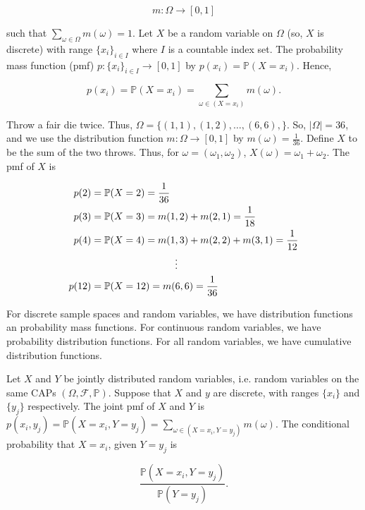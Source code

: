 \documentclass[12pt]{article}
\newcommand{\faps}{(\Omega, \field, \mathbb{P})}
\newcommand{\field}{\mathcal{F}}
\newcommand{\prob}[1]{\mathbb{P}(#1)}
\newcommand{\nspace}{\vspace*{.5cm}}
\newcommand{\nline}{\nspace \noindent}
\begin{document}
\begin{equation*}
m : \Omega \rightarrow [0,1]
\end{equation*}

\noindent
such that $\sum_{\omega \in \Omega} m(\omega) = 1$. Let $X$ be a random variable on $\Omega$ (so, $X$ is discrete) with range $\{ x_i \}_{i \in I}$ where $I$ is a countable index set. The probability mass function (pmf) $p: \{ x_i \}_{i \in I} \rightarrow [0,1]$ by $p(x_i) = \prob{X = x_i}$. Hence, 

\begin{equation*}
p(x_i) = \prob{X = x_i} = \sum_{\omega \in (X = x_i)} m(\omega).
\end{equation*}

\noindent
Throw a fair die twice. Thus, $\Omega = \Big \{ (1,1), (1,2), \ldots, (6,6), \Big \}$. So, $\lvert \Omega \rvert = 36$, and we use the distribution function $m : \Omega \rightarrow [0,1]$ by $m(\omega) = \frac{1}{36}$. Define $X$ to be the sum of the two throws. Thus, for $\omega = (\omega_1, \omega_2)$, $X(\omega) = \omega_1 + \omega_2$. The pmf of $X$ is 

\begin{align*}
p(2) & = \prob{X = 2} = \frac{1}{36} \\
p(3) & = \prob{X = 3} = m(1,2) + m(2,1) = \frac{1}{18} \\
p(4) & = \prob{X = 4} = m(1,3) + m(2,2) + m(3,1) = \frac{1}{12} \\
& \hspace*{3cm} \vdots \\
p(12) & = \prob{X = 12} = m(6,6) = \frac{1}{36} \\
\end{align*}

\noindent
For discrete sample spaces and random variables, we have distribution functions an probability mass functions. For continuous random variables, we have probability distribution functions. For all random variables, we have cumulative distribution functions. 

\nline
Let $X$ and $Y$ be jointly distributed random variables, i.e. random variables on the same CAPs $\faps$. Suppose that $X$ and $y$ are discrete, with ranges $\{ x_i \}$ and $\{ y_j \}$ respectively. The joint pmf of $X$ and $Y$ is $p(x_i, y_j) = \prob{ X = x_i, Y = y_j} = \sum_{\omega \in (X = x_i, Y = y_j)} m(\omega)$. The conditional probability that $X = x_i$, given $Y=y_j$ is

\begin{equation*}
\frac{\prob{X = x_i, Y = y_j}}{\prob{Y = y_j}}.
\end{equation*} 
\end{document}
